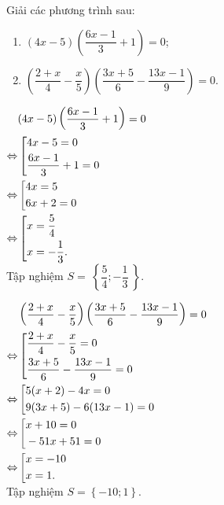 {\begin{vd}
{}
\end{vd}



\begin{vd}%
	 Giải các phương trình sau:
		\begin{enumerate}
		\item $(4x - 5)\left( \dfrac{6x - 1}{3} + 1 \right) = 0$; 
		\item $\left( \dfrac{2+x}{4} - \dfrac{x}{5}\right) \left(\dfrac{3x+5}{6} - \dfrac{13x - 1}{9}\right) = 0. $ 
		
	\end{enumerate}
	\loigiai
	{
		\begin{listEX}[2]
		\item $ \begin{aligned}[t]
		&(4x - 5)\left( \dfrac{6x - 1}{3} + 1 \right) = 0 \\
		 \Leftrightarrow &\left[\begin{aligned}&4x - 5 = 0\\&\dfrac{6x - 1}{3} + 1= 0 \end{aligned}\right.\\
		\Leftrightarrow & \left[\begin{aligned}&4x = 5\\ & 6x + 2 = 0\end{aligned}\right. \\
		\Leftrightarrow & \left[\begin{aligned}&x = \dfrac{5}{4}\\ & x = -\dfrac{1}{3}.\end{aligned}\right. \\
		\end{aligned}$\\
		Tập nghiệm $S =\ \left\{ \dfrac{5}{4}; -\dfrac{1}{3} \ \right\}. $
		\item 
		 $ \begin{aligned}[t]
		&\left( \dfrac{2+x}{4} - \dfrac{x}{5}\right) \left(\dfrac{3x+5}{6} - \dfrac{13x - 1}{9}\right) = 0 \\
		\Leftrightarrow &\left[\begin{aligned}& \dfrac{2+x}{4} - \dfrac{x}{5}  = 0\\&\dfrac{3x + 5}{6} - \dfrac{13x - 1}{9} = 0 \end{aligned}\right.\\
		\Leftrightarrow &\left[\begin{aligned}&5(x + 2) - 4x = 0\\ & 9(3x + 5) - 6(13x - 1) = 0\end{aligned}\right. \\
		\Leftrightarrow &\left[\begin{aligned}&x + 10 = 0\\ & -51 x + 51 = 0\end{aligned}\right. \\
		\Leftrightarrow &\left[\begin{aligned}&x = -10\\ & x = 1.\end{aligned}\right. \\
	\end{aligned}$\\
		Tập nghiệm $S = \left\{-10;1\right\}$.		
		

\end{listEX}}
\end{vd}}

